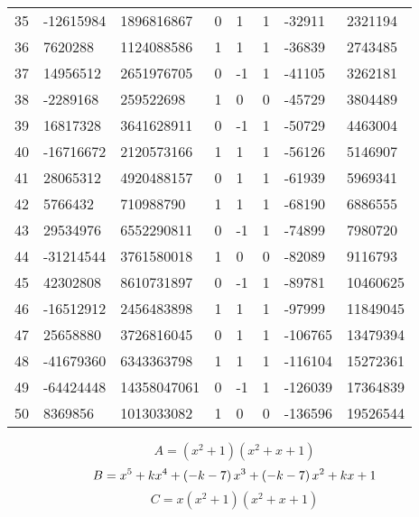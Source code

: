 \documentclass{amsart}
\begin{document}
\begin{longtable}{|l|l|l|lllll|}
35&-12615984&1896816867&0&1&1&-32911&2321194\\
36&7620288&1124088586&1&1&1&-36839&2743485\\
37&14956512&2651976705&0&-1&1&-41105&3262181\\
38&-2289168&259522698&1&0&0&-45729&3804489\\
39&16817328&3641628911&0&-1&1&-50729&4463004\\
40&-16716672&2120573166&1&1&1&-56126&5146907\\
41&28065312&4920488157&0&1&1&-61939&5969341\\
42&5766432&710988790&1&1&1&-68190&6886555\\
43&29534976&6552290811&0&-1&1&-74899&7980720\\
44&-31214544&3761580018&1&0&0&-82089&9116793\\
45&42302808&8610731897&0&-1&1&-89781&10460625\\
46&-16512912&2456483898&1&1&1&-97999&11849045\\
47&25658880&3726816045&0&1&1&-106765&13479394\\
48&-41679360&6343363798&1&1&1&-116104&15272361\\
49&-64424448&14358047061&0&-1&1&-126039&17364839\\
50&8369856&1013033082&1&0&0&-136596&19526544\\
\hline
\end{longtable}
$$A=(x^2
 + 1)(x^2
 + x
 + 1)$$
$$B=x^5
 + k\*x^4
 + \left(-k
 - 7\right) \*x^3
 + \left(-k
 - 7\right) \*x^2
 + k\*x
 + 1$$
$$C=x(x^2
 + 1)(x^2
 + x
 + 1)$$
\end{document}
